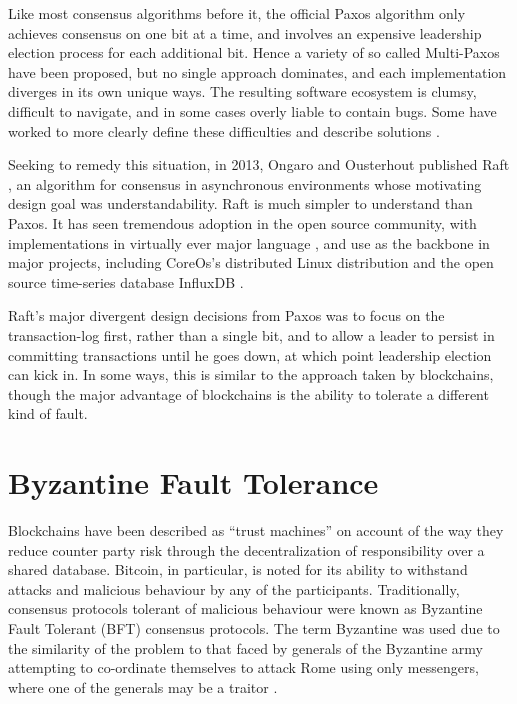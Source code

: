 Like most consensus algorithms before it, the official Paxos algorithm only achieves consensus on one bit at a time,
and involves an expensive leadership election process for each additional bit. 
Hence a variety of so called Multi-Paxos have been proposed, but no single approach dominates, 
and each implementation diverges in its own unique ways. 
The resulting software ecosystem is clumsy, difficult to navigate, and in some cases overly liable to contain bugs.
Some have worked to more clearly define these difficulties 
and describe solutions \cite{chandra2007paxos}.

Seeking to remedy this situation, in 2013, Ongaro and Ousterhout published Raft \cite{raft},
an algorithm for consensus in asynchronous environments whose motivating design goal was understandability.
Raft is much simpler to understand than Paxos.
It has seen tremendous adoption in the open source community, 
with implementations in virtually ever major language \cite{raft.github.io},
and use as the backbone in major projects, 
including CoreOs's distributed Linux distribution \cite{coreos_raft} and the open source time-series database InfluxDB \cite{influxdb,hashicorp_raft}.

Raft's major divergent design decisions from Paxos was to focus on the transaction-log first, rather than a single bit,
and to allow a leader to persist in committing transactions until he goes down, 
at which point leadership election can kick in. 
In some ways, this is similar to the approach taken by blockchains, 
though the major advantage of blockchains is the ability to tolerate a different kind of fault.

\section{Byzantine Fault Tolerance}

Blockchains have been described as ``trust machines'' \cite{economist_blockchains} on account of the way they reduce counter party risk through the decentralization of responsibility over a shared database.
Bitcoin, in particular, is noted for its ability to withstand attacks and malicious behaviour by any of the participants. 
Traditionally, consensus protocols tolerant of malicious behaviour were known as Byzantine Fault Tolerant (BFT) consensus protocols.
The term Byzantine was used due to the similarity of the problem to that faced by generals of the Byzantine army attempting to co-ordinate themselves to attack Rome using only messengers,
where one of the generals may be a traitor \cite{lamport1982byzantine}.

